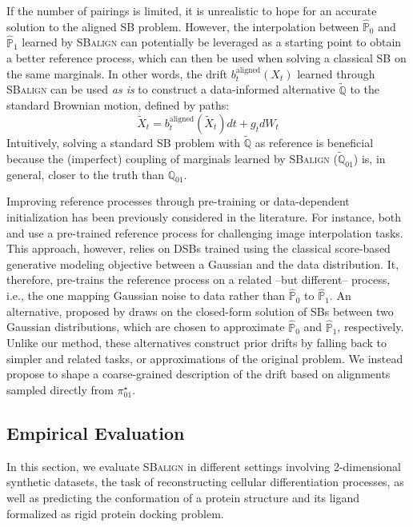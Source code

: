 If the number of pairings is limited,  it is unrealistic to hope for an accurate solution to the aligned SB problem. However, the interpolation between $\hat{\mathbb{P}}_0$ and $\hat{\mathbb{P}}_1$ learned by \textsc{SBalign} can potentially be leveraged as a starting point to obtain a better reference process, which can then be used when solving a classical SB on the same marginals. In other words, the drift $b^\text{aligned}_t(X_t)$ learned through \textsc{SBalign} can be used \textit{as is} to construct a data-informed alternative $\tilde{\mathbb{Q}}$ to the standard Brownian motion, defined by paths:
\[
    \tilde{X}_t = b^\text{aligned}_t(\tilde{X}_t) dt + g_t dW_t
\]
Intuitively, solving a standard SB problem with $\tilde{\mathbb{Q}}$ as reference is beneficial because the (imperfect) coupling of marginals learned by \textsc{SBalign} ($\tilde{\mathbb{Q}}_{01}$) is, in general, closer to the truth than $\mathbb{Q}_{01}$.

Improving reference processes through pre-training or data-dependent initialization has been previously considered in the literature. For instance, both \citet{de2021diffusion} and \citet{chen2021likelihood} use a pre-trained reference process for challenging image interpolation tasks. This approach, however, relies on DSBs trained using the classical score-based generative modeling objective between a Gaussian and the data distribution. It, therefore, pre-trains the reference process on a related --but different-- process, i.e., the one mapping Gaussian noise to data rather than $\hat{\mathbb{P}}_0$ to $\hat{\mathbb{P}}_1$.
An alternative, proposed by \citet{bunne2022recovering} draws on the closed-form solution of SBs between two Gaussian distributions, which are chosen to approximate $\hat{\mathbb{P}}_0$ and $\hat{\mathbb{P}}_1$, respectively.
Unlike our method, these alternatives construct prior drifts by falling back to simpler and related tasks, or approximations of the original problem. We instead propose to shape a coarse-grained description of the drift based on alignments sampled directly from $\pi^\star_{01}$. 


\subsection{Empirical Evaluation}
In this section, we evaluate \textsc{SBalign} in different settings involving 2-dimensional synthetic datasets, the task of reconstructing cellular differentiation processes, as well as predicting the conformation of a protein structure and its ligand formalized as rigid protein docking problem.

